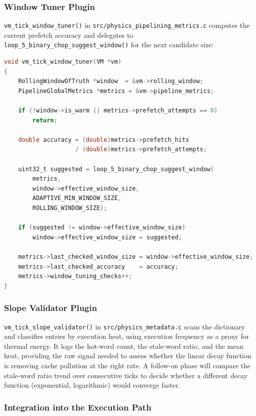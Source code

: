 \subsubsection{Window Tuner Plugin}

\texttt{vm\_tick\_window\_tuner()} in \texttt{src/physics\_pipelining\_metrics.c}
computes the current prefetch accuracy and delegates to
\texttt{loop\_5\_binary\_chop\_suggest\_window()} for the next candidate size:

\begin{lstlisting}[language=C]
void vm_tick_window_tuner(VM *vm)
{
    RollingWindowOfTruth *window  = &vm->rolling_window;
    PipelineGlobalMetrics *metrics = &vm->pipeline_metrics;

    if (!window->is_warm || metrics->prefetch_attempts == 0)
        return;

    double accuracy = (double)metrics->prefetch_hits
                    / (double)metrics->prefetch_attempts;

    uint32_t suggested = loop_5_binary_chop_suggest_window(
        metrics,
        window->effective_window_size,
        ADAPTIVE_MIN_WINDOW_SIZE,
        ROLLING_WINDOW_SIZE);

    if (suggested != window->effective_window_size)
        window->effective_window_size = suggested;

    metrics->last_checked_window_size = window->effective_window_size;
    metrics->last_checked_accuracy    = accuracy;
    metrics->window_tuning_checks++;
}
\end{lstlisting}

\subsubsection{Slope Validator Plugin}

\texttt{vm\_tick\_slope\_validator()} in \texttt{src/physics\_metadata.c}
scans the dictionary and classifies entries by execution heat, using execution
frequency as a proxy for thermal energy.  It logs the hot-word count, the
stale-word ratio, and the mean heat, providing the raw signal needed to assess
whether the linear decay function is removing cache pollution at the right rate.
A follow-on phase will compare the stale-word ratio trend over consecutive ticks
to decide whether a different decay function (exponential, logarithmic) would
converge faster.

\subsubsection{Integration into the Execution Path}

